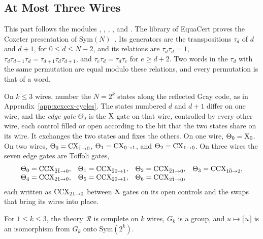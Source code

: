 \documentclass[acmsmall,screen,nonacm]{acmart}
\begin{document}
\subsection{At Most Three Wires}\label{app:xcxccx-small}

This part follows the modules , , , , and . The library of EquaCert proves the Coxeter presentation of $\mathrm{Sym}(N)$~\cite{coxeter1980generators}. Its generators are the transpositions $\tau_d$ of $d$ and $d+1$, for $0\le d\le N-2$, and its relations are $\tau_d\tau_d=1$, $\tau_d\tau_{d+1}\tau_d=\tau_{d+1}\tau_d\tau_{d+1}$, and $\tau_e\tau_d=\tau_d\tau_e$ for $e\ge d+2$. Two words in the $\tau_d$ with the same permutation are equal modulo these relations, and every permutation is that of a word.

On $k\le3$ wires, number the $N=2^k$ states along the reflected Gray code, as in Appendix~\ref{app:xcxccx-cycles}. The states numbered $d$ and $d+1$ differ on one wire, and the \emph{edge gate} $\Theta_d$ is the $\mathrm{X}$ gate on that wire, controlled by every other wire, each control filled or open according to the bit that the two states share on its wire. It exchanges the two states and fixes the others. On one wire, $\Theta_0=\mathrm{X}_0$. On two wires, $\Theta_0=\mathrm{CX}_{\bar1\to0}$, $\Theta_1=\mathrm{CX}_{0\to1}$, and $\Theta_2=\mathrm{CX}_{1\to0}$. On three wires the seven edge gates are Toffoli gates,
\[
\begin{array}{@{}l@{\quad}l@{\quad}l@{\quad}l@{}}
\Theta_0=\CCX_{\bar2\bar1\to0}, & \Theta_1=\CCX_{\bar20\to1}, & \Theta_2=\CCX_{\bar21\to0}, & \Theta_3=\CCX_{1\bar0\to2},\\
\Theta_4=\CCX_{21\to0}, & \Theta_5=\CCX_{20\to1}, & \Theta_6=\CCX_{2\bar1\to0}, &
\end{array}
\]
each written as $\mathrm{CCX}_{21\to0}$ between $\mathrm{X}$ gates on its open controls and the swaps that bring its wires into place.

\begin{proposition}\label{prop:x-small}
For $1\le k\le3$, the theory $\mathcal{R}$ is complete on $k$ wires, $G_k$ is a group, and $u\mapsto\llbracket u\rrbracket$ is an isomorphism from $G_k$ onto $\mathrm{Sym}(2^k)$.
\end{proposition}
\end{document}
